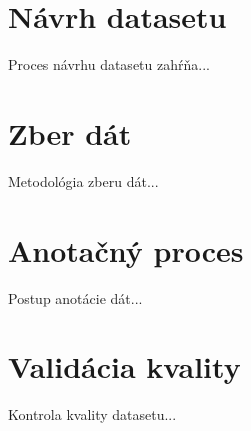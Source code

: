 \section{Návrh datasetu}

Proces návrhu datasetu zahŕňa...

\section{Zber dát}

Metodológia zberu dát...

\section{Anotačný proces}

Postup anotácie dát...

\section{Validácia kvality}

Kontrola kvality datasetu...
